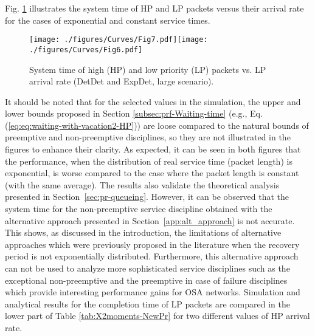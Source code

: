 \documentclass[11pt,journal,oneside,onecolumn,draftclsnofoot]{IEEEtran}
\begin{document}
Fig. \ref{30212-D2-ED-Large} illustrates the system time of HP and LP packets versus their arrival rate for the cases of exponential and constant service times. 
\begin{figure}\texttt{[image: ./figures/Curves/Fig7.pdf]}\texttt{[image: ./figures/Curves/Fig6.pdf]}\caption{System time of high (HP) and low priority (LP) packets vs. LP arrival rate (DetDet and ExpDet, large scenario).}\label{30212-D2-ED-Large}\end{figure}
It should be noted that for the selected values in the simulation, the upper and lower bounds proposed in Section \ref{subsec:prf-Waiting-time} (e.g., Eq. (\ref{eq:eq:waiting-with-vacation2-HP})) are loose compared to the natural bounds of preemptive and non-preemptive disciplines, so they are not illustrated in the figures to enhance their clarity.
As expected, it can be seen in both figures that the performance, when the distribution of real service time (packet length) is exponential, is worse compared to the case where the packet length is constant (with the same average). The results also validate the theoretical analysis presented in Section~\ref{sec:pr-queueing}. However, it can be observed that the system time for the non-preemptive service discipline obtained with the alternative approach presented in Section~\ref{app:alt_approach} is not accurate. This shows, as discussed in the introduction, the limitations of alternative approaches which were previously proposed in the literature when the recovery period is not exponentially distributed. Furthermore, this alternative approach can not be used to analyze more sophisticated service disciplines such as the exceptional non-preemptive and the preemptive in case of failure disciplines which provide interesting performance gains for OSA networks.
Simulation and analytical results for the completion time of LP packets are compared in the lower part of Table \ref{tab:X2moments-NewPr} for two different values of HP arrival rate. 
\end{document}
